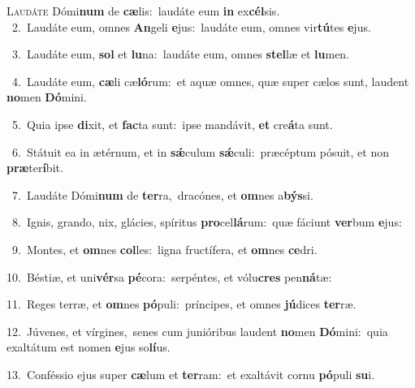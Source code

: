 \lettrine{\initial\textcolor{\initialcolor}{L}}{audáte} Dómi\textbf{num} de \textbf{cæ}\-lis:~\star laudáte eum \textbf{in} ex\-\textbf{cél}\-sis.\\
{\numbfont\textcolor{\numbcolor}{~2.}}~Laudáte eum, omnes \textbf{An}\-geli \textbf{e}\-jus:~\star laudáte eum, omnes vir\-\textbf{tú}\-tes \textbf{e}\-jus.\par
{\numbfont\textcolor{\numbcolor}{~3.}}~Laudáte eum, \textbf{sol} et \textbf{lu}\-na:~\star laudáte eum, omnes \textbf{stel}\-læ et \textbf{lu}\-men.\par
{\numbfont\textcolor{\numbcolor}{~4.}}~Laudáte eum, \textbf{cæ}\-li cæ\-\textbf{ló}\-rum:~\star et aquæ omnes, quæ super cælos sunt, laudent \textbf{no}\-men \textbf{Dó}\-mini.\par
{\numbfont\textcolor{\numbcolor}{~5.}}~Quia ipse \textbf{di}\-xit, et \textbf{fac}\-ta sunt:~\star ipse mandávit, \textbf{et} cre\-\textbf{á}\-ta sunt.\par
{\numbfont\textcolor{\numbcolor}{~6.}}~Státuit ea in ætérnum, et in \textbf{sǽ}\-culum \textbf{sǽ}\-culi:~\star præcéptum pósuit, et non \textbf{præ}\-ter\-\textbf{í}\-bit.\par
{\numbfont\textcolor{\numbcolor}{~7.}}~Laudáte Dómi\textbf{num} de \textbf{ter}\-ra,~\star dracónes, et \textbf{om}\-nes a\-\textbf{býs}\-si.\par
{\numbfont\textcolor{\numbcolor}{~8.}}~Ignis, grando, nix, glácies, spíritus \textbf{pro}\-cel\-\textbf{lá}\-rum:~\star quæ fáciunt \textbf{ver}\-bum \textbf{e}\-jus:\par
{\numbfont\textcolor{\numbcolor}{~9.}}~Montes, et \textbf{om}\-nes \textbf{col}\-les:~\star ligna fructífera, et \textbf{om}\-nes \textbf{ce}\-dri.\par
{\numbfont\textcolor{\numbcolor}{10.}}~Béstiæ, et uni\-\textbf{vér}\-sa \textbf{pé}\-cora:~\star serpéntes, et vólu\textbf{cres} pen\-\textbf{ná}\-tæ:\par
{\numbfont\textcolor{\numbcolor}{11.}}~Reges terræ, et \textbf{om}\-nes \textbf{pó}\-puli:~\star príncipes, et omnes \textbf{jú}\-dices \textbf{ter}\-ræ.\par
{\numbfont\textcolor{\numbcolor}{12.}}~Júvenes, et vírgines,~\dagger senes cum junióribus laudent \textbf{no}\-men \textbf{Dó}\-mini:~\star quia exaltátum est nomen \textbf{e}\-jus so\-\textbf{lí}\-us.\par
{\numbfont\textcolor{\numbcolor}{13.}}~Conféssio ejus super \textbf{cæ}\-lum et \textbf{ter}\-ram:~\star et exaltávit cornu \textbf{pó}\-puli \textbf{su}\-i.\par
